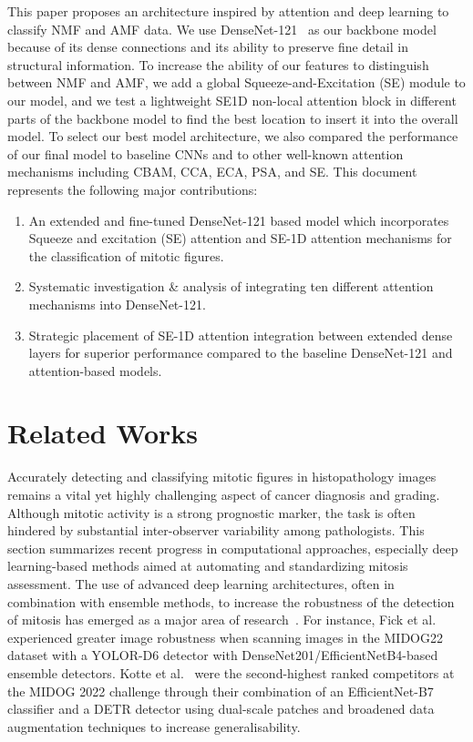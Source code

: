 \documentclass[conference]{IEEEtran}
\begin{document}
This paper proposes an architecture inspired by attention and deep learning to classify NMF and AMF data. We use DenseNet-121~\cite{Huang2017} as our backbone model because of its dense connections and its ability to preserve fine detail in structural information. To increase the ability of our features to distinguish between NMF and AMF, we add a global Squeeze-and-Excitation (SE) module to our model, and we test a lightweight SE1D non-local attention block in different parts of the backbone model to find the best location to insert it into the overall model. To select our best model architecture, we also compared the performance of our final model to baseline CNNs and to other well-known attention mechanisms including CBAM, CCA, ECA, PSA, and SE. This document represents the following major contributions:
\begin{enumerate}
    \item An extended and fine-tuned DenseNet-121 based model which incorporates Squeeze and excitation (SE) attention and SE-1D attention mechanisms for the classification of mitotic figures. 
    \item Systematic investigation \& analysis of integrating ten different attention mechanisms into DenseNet-121.
    \item Strategic placement of SE-1D attention integration between extended dense layers for superior performance compared to the baseline DenseNet-121 and attention-based models. 
\end{enumerate}


\section{Related Works}
Accurately detecting and classifying mitotic figures in histopathology images remains a vital yet highly challenging aspect of cancer diagnosis and grading. Although mitotic activity is a strong prognostic marker, the task is often hindered by substantial inter-observer variability among pathologists. This section summarizes recent progress in computational approaches, especially deep learning-based methods aimed at automating and standardizing mitosis assessment. The use of advanced deep learning architectures, often in combination with ensemble methods, to increase the robustness of the detection of mitosis has emerged as a major area of research~\cite{Fick2024, Lin2024}. For instance,  Fick et al.\cite{Fick2024} experienced greater image robustness when scanning images in the MIDOG22 dataset with a YOLOR-D6 detector with DenseNet201/EfficientNetB4-based ensemble detectors. Kotte et al.~\cite{Kotte2022} were the second-highest ranked competitors at the MIDOG 2022 challenge through their combination of an EfficientNet-B7 classifier and a DETR detector using dual-scale patches and broadened data augmentation techniques to increase generalisability. 
\end{document}
